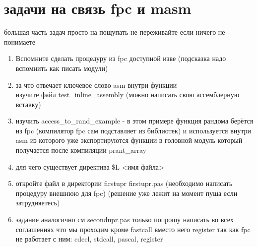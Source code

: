 \documentclass[a4paper,10pt]{article}
\begin{document}
\section*{задачи на связь fpc и masm}
большая часть задач просто на пощупать не переживайте если ничего не понимаете
\begin{enumerate}
    \item Вспомните сделать процедуру из fpc доступной изве (подсказка надо вспомнить как писать модули)
    \item за что отвечает ключевое слово asm внутри функции \\
    изучите  файл test\_inline\_assembly (можно написать свою ассемблерную вставку)
    \item изучить access\_to\_rand\_example - в этом примере функция рандома берётся из fpc (компилятор fpc сам подставляет из библиотек) и используется внутри asm из которого уже экспортируются функции в головной модуль который получается после компиляции prant\_array 
    \item для чего существует директива {\$L <имя файла>}
    \item откройте файл в директории firstupr firstupr.pas (необходимо написать процедуру внешнюю для fpc) (решение уже лежит на момент пуша если затрудняетесь)
    \item задание аналогично см secondupr.pas только попрошу написать во всех соглашениях что мы проходим кроме fastcall вместо него register так как fpc не работает с ним: cdecl, stdcall, pascal, register
\end{enumerate}
\end{document}
